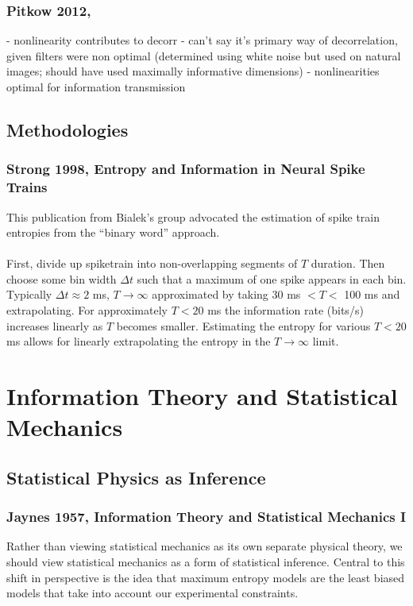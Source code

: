\documentclass{article}
\begin{document}
\subsubsection{Pitkow 2012, }
 - nonlinearity contributes to decorr - can't say it's primary way of decorrelation, given filters were non optimal (determined using white noise but used on natural images; should have used maximally informative dimensions)
 - nonlinearities optimal for information transmission
 
 
 
\subsection{Methodologies}
\subsubsection{Strong 1998, Entropy and Information in Neural Spike Trains}
This publication from Bialek's group advocated the estimation of spike train entropies from the ``binary word'' approach.\\
\\
First, divide up spiketrain into non-overlapping segments of $T$ duration. Then choose some bin width $\Delta t$ such that a maximum of one spike appears in each bin.  Typically $\Delta t \approx 2$ ms, $T \to \infty$ approximated by taking 30 ms $< T <$ 100 ms and extrapolating.  For  approximately $T < 20$ ms the information rate (bits/s) increases linearly as $T$ becomes smaller.  Estimating the entropy for various $T < 20$ ms allows for linearly extrapolating the entropy in the $T \to \infty$ limit.



\section{Information Theory and Statistical Mechanics}

\subsection{Statistical Physics as Inference}
\subsubsection{Jaynes 1957, Information Theory and Statistical Mechanics I}
Rather than viewing statistical mechanics as its own separate physical theory, we should view statistical mechanics as a form of statistical inference.  Central to this shift in perspective is the idea that maximum entropy models are the least biased models that take into account our experimental constraints.
\end{document}
